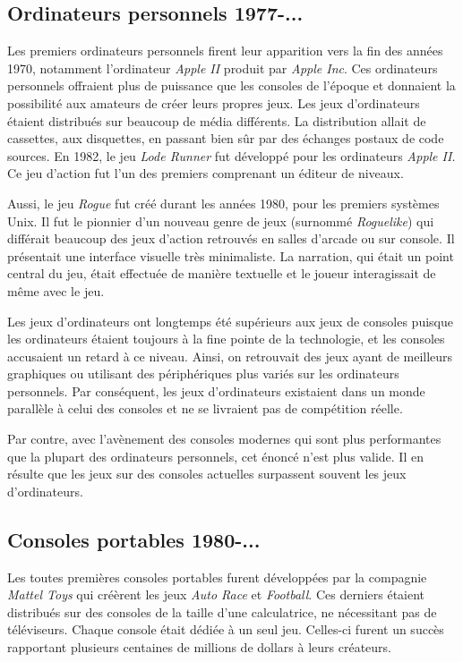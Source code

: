 \documentclass[12pt,twoside,letterpaper,francais]{book}
\begin{document}
\FloatBarrier
\subsection{Ordinateurs personnels 1977-...}
Les premiers ordinateurs personnels firent leur apparition vers la fin
des années 1970, notamment l'ordinateur \textit{Apple II} produit par
\textit{Apple Inc}. Ces ordinateurs personnels offraient plus de
puissance que les consoles de l'époque et donnaient la possibilité aux
amateurs de créer leurs propres jeux. Les jeux d'ordinateurs étaient
distribués sur beaucoup de média différents. La distribution allait de
cassettes, aux disquettes, en passant bien sûr par des échanges
postaux de code sources. En 1982, le jeu \textit{Lode Runner} fut développé pour les
ordinateurs \textit{Apple II}. Ce jeu d'action fut l'un des premiers
comprenant un éditeur de niveaux.

Aussi, le jeu \textit{Rogue} fut créé durant les années 1980, pour les
premiers systèmes Unix. Il fut le pionnier d'un nouveau genre de jeux
(surnommé \textit{Roguelike}) qui différait beaucoup des jeux d'action
retrouvés en salles d'arcade ou sur console. Il présentait une
interface visuelle très minimaliste. La narration, qui était un point
central du jeu, était effectuée de manière textuelle et le joueur
interagissait de même avec le jeu.

Les jeux d'ordinateurs ont longtemps été supérieurs aux jeux de
consoles puisque les ordinateurs étaient toujours à la fine pointe de
la technologie, et les consoles accusaient un retard à ce
niveau. Ainsi, on retrouvait des jeux ayant de meilleurs graphiques ou
utilisant des périphériques plus variés sur les ordinateurs
personnels. Par conséquent, les jeux d'ordinateurs existaient dans un
monde parallèle à celui des consoles et ne se livraient pas de
compétition réelle.

Par contre, avec l'avènement des consoles modernes qui sont plus
performantes que la plupart des ordinateurs personnels, cet énoncé
n'est plus valide. Il en résulte que les jeux sur des consoles
actuelles surpassent souvent les jeux d'ordinateurs.


\FloatBarrier
\subsection{Consoles portables 1980-...}
Les toutes premières consoles portables furent développées par la
compagnie \textit{Mattel Toys} qui créèrent les jeux \textit{Auto
  Race} et \textit{Football}. Ces derniers étaient distribués sur des
consoles de la taille d'une calculatrice, ne nécessitant pas de
téléviseurs. Chaque console était dédiée à un seul jeu. Celles-ci
furent un succès rapportant plusieurs centaines de millions de dollars
à leurs créateurs.
\end{document}
